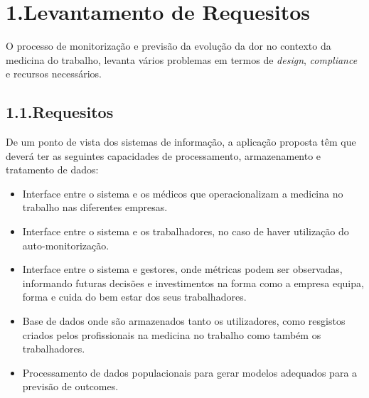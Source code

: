 \documentclass{article}
\begin{document}
\mdxtitleblockstart{}

\mdxauthorstart{}
\mdxauthorend\mdtitleauthorrunning{}{}\mdxtitleblockend%

\section{1.\hspace*{0.5em}Levantamento de Requesitos}\label{sec-levantamento-de-requesitos}%

\noindent{}O processo de monitorização e previsão da evolução da dor no contexto da medicina do trabalho, levanta vários problemas em termos de \emph{design}, \emph{compliance} e recursos necessários.%

\subsection{1.1.\hspace*{0.5em}Requesitos}\label{sec-requesitos}%

\noindent{}De um ponto de vista dos sistemas de informação, a aplicação proposta têm que deverá ter as seguintes capacidades de processamento, armazenamento e tratamento de dados:%

\begin{itemize}[noitemsep,topsep=\mdcompacttopsep]%

\item{}Interface entre o sistema e os médicos que operacionalizam a medicina no trabalho nas diferentes empresas.%

\item{}Interface entre o sistema e os trabalhadores, no caso de haver utilização do auto-monitorização.%

\item{}Interface entre o sistema e gestores, onde métricas podem ser observadas, informando futuras decisões e investimentos na forma como a empresa equipa, forma e cuida do bem estar dos seus trabalhadores.%

\item{}Base de dados onde são armazenados tanto os utilizadores, como resgistos criados pelos profissionais na medicina no trabalho como também os trabalhadores.%

\item{}Processamento de dados populacionais para gerar modelos adequados para a previsão de outcomes.%
\end{itemize}%
\end{document}
